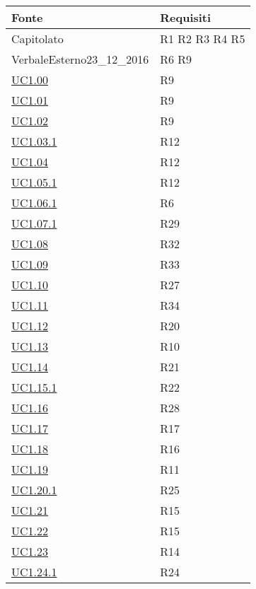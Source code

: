\begin{longtable}{|P{6cm}|P{6cm}|}
	\hline \textbf{Fonte} & \textbf{Requisiti}\\
	\hline Capitolato & R1 \linebreak R2 \linebreak R3 \linebreak R4 \linebreak R5 \\
	\hline VerbaleEsterno23\_12\_2016 & R6 \linebreak R9 \\
	\hline \hyperref[UC1.00]{UC1.00} & R9 \\
	\hline \hyperref[UC1.01]{UC1.01} & R9 \\
	\hline \hyperref[UC1.02]{UC1.02} & R9 \\
	\hline \hyperref[UC1.03.1]{UC1.03.1} & R12 \\
	\hline \hyperref[UC1.04]{UC1.04} & R12 \\
	\hline \hyperref[UC1.05.1]{UC1.05.1} & R12 \\
	\hline \hyperref[UC1.06.1]{UC1.06.1} & R6 \\
	\hline \hyperref[UC1.07.1]{UC1.07.1} & R29 \\
	\hline \hyperref[UC1.08]{UC1.08} & R32 \\
	\hline \hyperref[UC1.09]{UC1.09} & R33 \\
	\hline \hyperref[UC1.10]{UC1.10} & R27 \\
	\hline \hyperref[UC1.11]{UC1.11} & R34 \\	
	\hline \hyperref[UC1.12]{UC1.12} & R20 \\
	\hline \hyperref[UC1.13]{UC1.13} & R10 \\	
	\hline \hyperref[UC1.14]{UC1.14} & R21 \\
	\hline \hyperref[UC1.15.1]{UC1.15.1} & R22 \\
	\hline \hyperref[UC1.16]{UC1.16} & R28 \\
	\hline \hyperref[UC1.17]{UC1.17} & R17 \\
	\hline \hyperref[UC1.18]{UC1.18} & R16 \\
	\hline \hyperref[UC1.19]{UC1.19} & R11 \\
	\hline \hyperref[UC1.20.1]{UC1.20.1} & R25 \\
	\hline \hyperref[UC1.21]{UC1.21} & R15 \\
	\hline \hyperref[UC1.22]{UC1.22} & R15 \\
	\hline \hyperref[UC1.23]{UC1.23} & R14 \\
	\hline \hyperref[UC1.24.1]{UC1.24.1} & R24 \\

\end{longtable}
